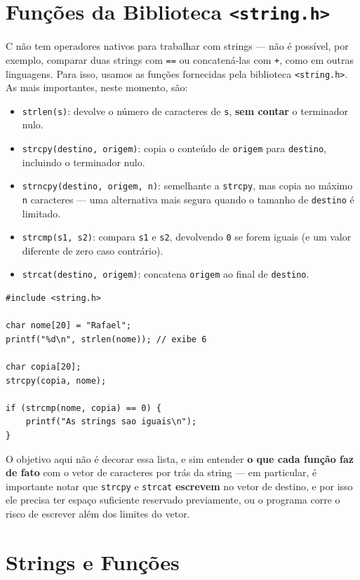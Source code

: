 \documentclass[12pt,a4paper,oneside]{extreport}
\begin{document}
\section{Funções da Biblioteca \texttt{<string.h>}}

C não tem operadores nativos para trabalhar com strings — não é possível, por exemplo, comparar duas strings com \texttt{==} ou concatená-las com \texttt{+}, como em outras linguagens. Para isso, usamos as funções fornecidas pela biblioteca \texttt{<string.h>}. As mais importantes, neste momento, são:

\begin{itemize}
    \item \texttt{strlen(s)}: devolve o número de caracteres de \texttt{s}, \textbf{sem contar} o terminador nulo.
    \item \texttt{strcpy(destino, origem)}: copia o conteúdo de \texttt{origem} para \texttt{destino}, incluindo o terminador nulo.
    \item \texttt{strncpy(destino, origem, n)}: semelhante a \texttt{strcpy}, mas copia no máximo \texttt{n} caracteres — uma alternativa mais segura quando o tamanho de \texttt{destino} é limitado.
    \item \texttt{strcmp(s1, s2)}: compara \texttt{s1} e \texttt{s2}, devolvendo \texttt{0} se forem iguais (e um valor diferente de zero caso contrário).
    \item \texttt{strcat(destino, origem)}: concatena \texttt{origem} ao final de \texttt{destino}.
\end{itemize}

\begin{lstlisting}
#include <string.h>

char nome[20] = "Rafael";
printf("%d\n", strlen(nome)); // exibe 6

char copia[20];
strcpy(copia, nome);

if (strcmp(nome, copia) == 0) {
    printf("As strings sao iguais\n");
}
\end{lstlisting}

O objetivo aqui não é decorar essa lista, e sim entender \textbf{o que cada função faz de fato} com o vetor de caracteres por trás da string — em particular, é importante notar que \texttt{strcpy} e \texttt{strcat} \textbf{escrevem} no vetor de destino, e por isso ele precisa ter espaço suficiente reservado previamente, ou o programa corre o risco de escrever além dos limites do vetor.

\section{Strings e Funções}
\end{document}
